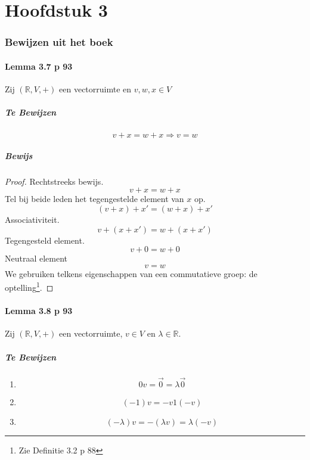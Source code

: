 \documentclass[lineaire_algebra_oplossingen.tex]{subfiles}
\begin{document}
\part{Hoofdstuk 3}

\section{Bewijzen uit het boek}
\subsection{Lemma 3.7 p 93}
Zij $(\mathbb{R},V,+)$ een vectorruimte en $v,w,x\in V$
\subsubsection*{Te Bewijzen}
\[
v+x = w+x \Rightarrow v=w
\]
\subsubsection*{Bewijs}
\begin{proof}
Rechtstreeks bewijs.\\
\[
v+x = w+x
\]
Tel bij beide leden het tegengestelde element van $x$ op.
\[
(v+x)+x' = (w+x)+x'
\]
Associativiteit.
\[
v + (x+x') = w+(x+x')
\]
Tegengesteld element.
\[
v + 0 = w+0
\]
Neutraal element
\[
v = w
\]
We gebruiken telkens eigenschappen van een commutatieve groep: de optelling\footnote{Zie Definitie 3.2 p 88}.
\end{proof}

\subsection{Lemma 3.8 p 93}
Zij $(\mathbb{R},V,+)$ een vectorruimte, $v\in V$ en $\lambda \in \mathbb{R}$.
\subsubsection*{Te Bewijzen}
\begin{enumerate}
\item
\[
0v = \vec{0} = \lambda\vec{0}
\]
\item
\[
(-1)v = -v 1(-v)
\]
\item
\[
(-\lambda)v = -(\lambda v ) = \lambda(-v)
\]
\end{enumerate}
\end{document}
